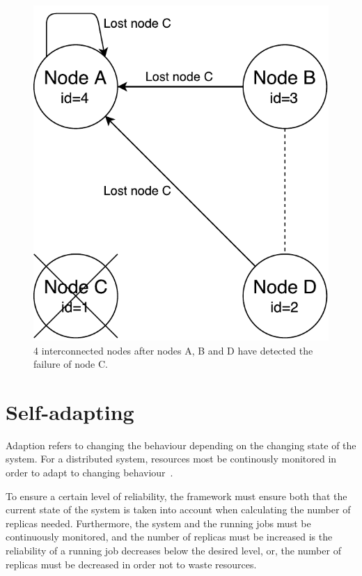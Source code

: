 \documentclass{cslthse-msc}
\begin{document}
\begin{figure}[!hbt]
\centering
\includegraphics[scale=0.5]{images/handling_node_failure.pdf}
\caption{4 interconnected nodes after nodes A, B and D have detected the failure of node C.}\label{fig:handling_node_failure}
\end{figure}

\section{Self-adapting} \label{sec:design_self_adapting}
Adaption refers to changing the behaviour depending on the changing state of the system. For a distributed system, resources most be continously monitored in order to adapt to changing behaviour~\cite{imprRelAdaptRL}.

To ensure a certain level of reliability, the framework must ensure both that the current state of the system is taken into account when calculating the number of replicas needed. Furthermore, the system and the running jobs must be continuously monitored, and the number of replicas must be increased is the reliability of a running job decreases below the desired level, or, the number of replicas must be decreased in order not to waste resources.
\end{document}
